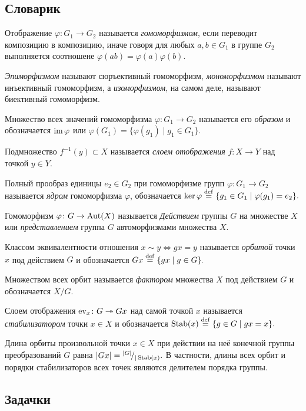 \documentclass[10pt]{article}
\begin{document}
\subsection*{Словарик}
\begin{bullets}
    \item Отображение $\varphi\colon G_1 \to G_2$ называется \emph{гомоморфизмом}, если переводит композицию в композицию, иначе говоря для любых $a,b \in G_1$ в группе $G_2$ выполняется соотношене \(\varphi(ab) = \varphi(a)\varphi(b)\).

    \emph{Эпиморфизмом} называют сюръективный гомоморфизм, \emph{мономорфизмом} называют инъективный гомоморфизм, а \emph{изоморфизмом}, на самом деле, называют биективный гомоморфизм.

    \item Множество всех значений гомоморфизма $\varphi \colon G_1 \to G_2$ называется его \emph{образом} и обозначается $\operatorname{im} \varphi$ или $\varphi (G_1) = \{\varphi(g_1)\mid g_1 \in G_1\}.$

    \item Подмножество $f^{-1}(y) \subset X$ называется \emph{слоем отображения} $f \colon X \to Y$ над точкой $y \in Y$.

    \item Полный прообраз единицы $e_2 \in G_2$ при гомоморфизме групп $\varphi \colon G_1 \to G_2$ называется \emph{ядром} гомоморфизма $\varphi$, обозначается \(\ker \varphi \overset{\footnotesize{\mathrm{def}}}{=} \{g_1 \in G_1 \mid \varphi(g_1) = e_2 \}.\)

    \item Гомоморфизм $\varphi\colon G \to \operatorname{Aut}(X)$ называется \emph{Действием} группы $G$ на множестве $X$ или \emph{представлением} группа $G$ автоморфизмами множества $X$. 

    \item Классом эквивалентности отношения $x \sim y \iff gx = y$ называется \emph{орбитой} точки $x$ под действием $G$ и обозначается 
    \(Gx \overset{\footnotesize{\mathrm{def}}}{=} \{gx \mid g \in G\}.\)

    Множеством всех орбит называется \emph{фактором} множества $X$ под действием $G$ и обозначается $X/G$.

    \item Слоем отображения $\operatorname{ev}_x \colon G \twoheadrightarrow Gx$ над самой точкой $x$ называется \emph{стабилизатором} точки $x \in X$ и обозначается \( \operatorname{Stab}(x) \overset{\footnotesize{\mathrm{def}}}{=} \{g \in G \mid gx = x \}.\)
    
    \item Длина орбиты произвольной точки $x \in X$ при действии на неё конечной группы преобразований $G$ равна $|Gx| = {}^{|G|}\!/_{|\operatorname{Stab}(x)}.$ В частности, длины всех орбит и порядки стабилизаторов всех точек являются делителем порядка группы.


\end{bullets}
\subsection*{Задачки}

\end{document}
